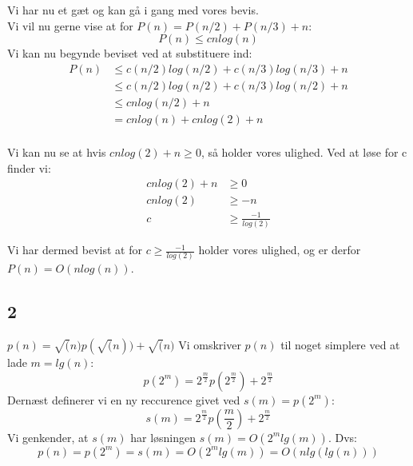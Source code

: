 Vi har nu et gæt og kan gå i gang med vores bevis.\\
Vi vil nu gerne vise at for $P(n) = P(n/2) + P(n/3) + n$:
\begin{equation*}
	P(n) \leq cnlog(n)
\end{equation*}
Vi kan nu begynde beviset ved at substituere ind:
\begin{align*}
	P(n) &\leq c(n/2)log(n/2) + c(n/3)log(n/3) + n\\
	&\leq c(n/2)log(n/2) + c(n/3)log(n/2) + n\\
	&\leq cnlog(n/2) + n\\
	&= cnlog(n) + cnlog(2) + n\\
\end{align*}

Vi kan nu se at hvis $cnlog(2) + n \geq 0$, så holder vores ulighed. Ved at løse for c finder vi:
\begin{align*}
	cnlog(2) + n &\geq 0\\
	cnlog(2) &\geq -n\\
	c &\geq \frac{-1}{log(2)}
\end{align*}

Vi har dermed bevist at for $c \geq \frac{-1}{log(2)}$ holder vores ulighed, og er derfor $P(n) = O(nlog(n))$.

\subsection{2}

$p(n) = \sqrt(n)p(\sqrt(n)) + \sqrt(n)$
Vi omskriver $p(n)$ til noget simplere ved at lade $m = lg(n)$:
$$p(2^m) = 2^{\frac{m}{2}}p(2^{\frac{m}{2}}) + 2^{\frac{m}{2}}$$
Dernæst definerer vi en ny reccurence givet ved $s(m) = p(2^m)$:
$$s(m) = 2^{\frac{m}{2}}p(\frac{m}{2}) + 2^{\frac{m}{2}}$$
Vi genkender, at $s(m)$ har løsningen $s(m) = O(2^mlg(m))$.
Dvs:
$$p(n) = p(2^m) = s(m) = O(2^mlg(m)) = O(nlg(lg(n)))$$
